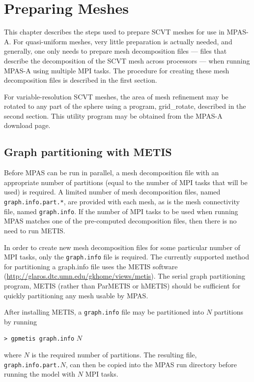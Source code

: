 \chapter{Preparing Meshes}
\label{chap:mpas_grid_preparation}

This chapter describes the steps used to prepare SCVT meshes for use in MPAS-A.
For quasi-uniform meshes, very little preparation is actually needed, and
generally, one only needs to prepare mesh decomposition files --- files that
describe the decomposition of the SCVT mesh across processors --- when running
MPAS-A using multiple MPI tasks. The procedure for creating these mesh
decomposition files is described in the first section. 

For variable-resolution SCVT meshes, the area of mesh refinement may be rotated
to any part of the sphere using a program, grid\_rotate, described in the second
section. This utility program may be obtained from the MPAS-A download page.
\section{Graph partitioning with METIS} 
\label{sec:metis}

Before MPAS can be run in parallel, a mesh decomposition file with an
appropriate number of partitions (equal to the number of MPI tasks that will be
used) is required. A limited number of mesh decomposition files, named {\tt
graph.info.part.*}, are provided with each mesh, as is the mesh
connectivity file, named {\tt graph.info}. If the number of MPI tasks to be used when
running MPAS matches one of the pre-computed decomposition files, then there
is no need to run METIS.

In order to create new mesh decomposition files for some particular number of MPI tasks, 
only the {\tt graph.info} file is required.  The currently supported method for partitioning
a graph.info file uses the METIS software
(\url{http://glaros.dtc.umn.edu/gkhome/views/metis}).  The serial graph partitioning
program, METIS (rather than ParMETIS or hMETIS) should be sufficient for
quickly partitioning any mesh usable by MPAS.

After installing METIS, a {\tt graph.info} file may be partitioned into $N$
partitions by running

\vspace{12pt}
{\tt > gpmetis graph.info} $N$
\vspace{12pt}

\noindent where $N$ is the required number of partitions. The resulting file, {\tt graph.info.part.}$N$, 
can then be copied into the MPAS run directory before running the model with $N$ MPI tasks.


